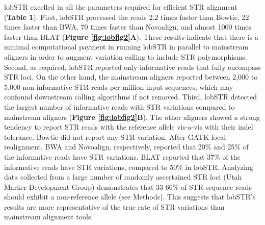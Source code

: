 lobSTR excelled in all the parameters required for efficient STR alignment (\textbf{Table 1}). First, lobSTR processed the reads 2.2 times faster than Bowtie, 22 times faster than BWA, 70 times faster than Novoalign, and almost 1000 times faster than BLAT (\textbf{Figure \ref{fig:lobfig2}A}). These results indicate that there is a minimal computational payment in running lobSTR in parallel to mainstream aligners in order to augment variation calling to include STR polymorphisms. Second, as required, lobSTR reported only informative reads that fully encompass STR loci. On the other hand, the mainstream aligners reported between 2,000 to 5,000 non-informative STR reads per million input sequences, which may confound downstream calling algorithms if not removed. Third, lobSTR detected the largest number of informative reads with STR variations compared to mainstream aligners (\textbf{Figure \ref{fig:lobfig2}B}). The other aligners showed a strong tendency to report STR reads with the reference allele vis-a-vis with their indel tolerance. Bowtie did not report any STR variation. After GATK local realignment, BWA and Novoalign, respectively, reported that 20\% and 25\% of the informative reads have STR variations. BLAT reported that 37\% of the informative reads have STR variations, compared to 50\% in lobSTR. Analyzing data collected from a large number of randomly ascertained STR loci \cite{PayseurJingHaasl2011} (Utah Marker Development Group) demonstrates that 33-66\% of STR sequence reads should exhibit a non-reference allele (see Methods). This suggests that lobSTR's results are more representative of the true rate of STR variations than mainstream alignment tools.

